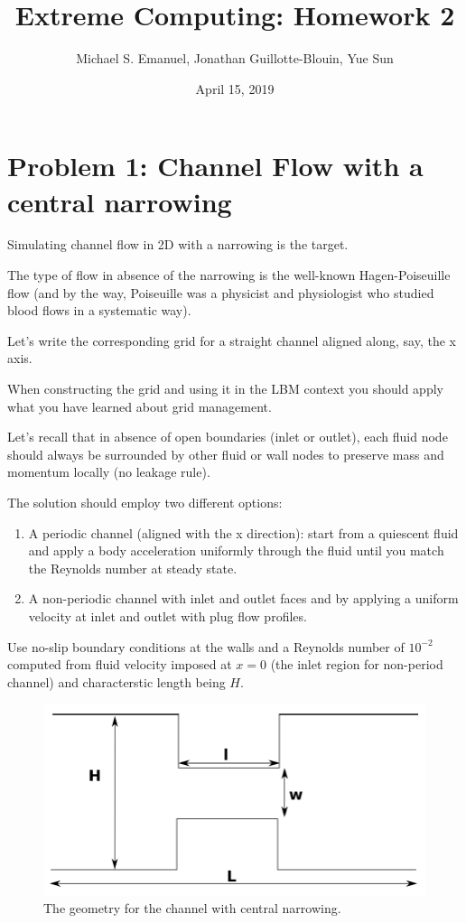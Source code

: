 \documentclass[11pt]{article}
\begin{document}
    \title{Extreme Computing: Homework 2}
    \author{Michael S. Emanuel, Jonathan Guillotte-Blouin, Yue Sun}
    \date{April 15, 2019}
    \maketitle

  \section{Problem 1:  Channel Flow with a central narrowing}
    Simulating channel flow in 2D with a narrowing is the target.

The type of flow in absence of the narrowing is the well-known Hagen-Poiseuille flow 
(and by the way, Poiseuille was a physicist and physiologist who studied blood flows 
in a systematic way).

Let's write the corresponding grid for a straight channel aligned along, say, the x axis. 

When constructing the grid and using it in the LBM context 
you should apply what you have learned about grid management. 

Let's recall that in absence of open boundaries (inlet or outlet), each fluid node should always 
be surrounded by other fluid or wall nodes to preserve mass and momentum locally (no leakage rule).

The solution should employ two different options:

    \begin{enumerate}
      \item A periodic channel (aligned with the x direction): start from a quiescent fluid and
      apply a body acceleration uniformly through the fluid until you match the Reynolds number at steady state.
      \item A non-periodic channel with inlet and outlet faces and by applying a uniform velocity 
      at inlet and outlet with plug flow profiles.
    \end{enumerate}

    Use no-slip boundary conditions at the walls and a Reynolds number of $10^{-2}$ computed from fluid velocity 
    imposed at $x=0$ (the inlet region for non-period channel) and characterstic length being $H$.

    \begin{figure}[h!]
      \centering{}\includegraphics[scale=1.0]{narrowing.png}
      \caption{The geometry for the channel with central narrowing.}
      \label{fig:narrowing}
    \end{figure}
\end{document}
